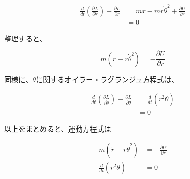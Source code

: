 \documentclass{jsarticle}
\begin{document}
\begin{enumerate}
\begin{enumerate}
                $$
                  \begin{aligned}
                    \frac{d}{dt}\left(\frac{\partial L}{\partial \dot{r}}\right) - \frac{\partial L}{\partial r}
                     & = m \ddot{r} - mr\dot{\theta}^2 + \frac{\partial U}{\partial r} \\
                     & = 0
                  \end{aligned}
                $$

                整理すると、

                $$
                  m(\ddot{r} - r \dot{\theta}^2)= -\frac{\partial U}{\partial r}
                $$

                同様に、$\theta$に関するオイラー・ラグランジュ方程式は、

                $$
                  \begin{aligned}
                    \frac{d}{dt}\left(\frac{\partial L}{\partial \dot{\theta}}\right) - \frac{\partial L}{\partial \theta} & = \frac{d}{dt}(r^2\dot{\theta}) \\
                                                                                                                           & = 0
                  \end{aligned}
                $$

                以上をまとめると、運動方程式は

                $$
                  \begin{aligned}
                    m(\ddot{r} - r \dot{\theta}^2) & = -\frac{\partial U}{\partial r} \\
                    \frac{d}{dt}(r^2\dot{\theta})  & = 0
                  \end{aligned}
                $$


        \end{enumerate}
\end{enumerate}
\end{document}
